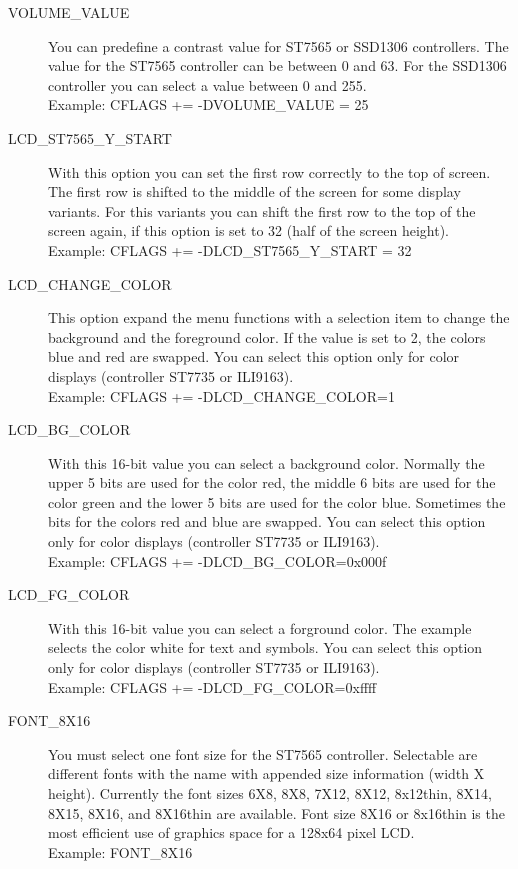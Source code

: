 \begin{description}
  \item[VOLUME\_VALUE] You can predefine a contrast value for ST7565 or SSD1306 controllers.
The value for the ST7565 controller can be between 0 and 63. For the SSD1306 controller you can
select a value between 0 and 255.\\
Example: CFLAGS += -DVOLUME\_VALUE = 25

  \item[LCD\_ST7565\_Y\_START] With this option you can set the first row correctly to the top of screen.
The first row is shifted to the middle of the screen for some display variants.
For this variants you can shift the first row to the top of the screen again,
if this option is set to 32 (half of the screen height).\\
Example: CFLAGS += -DLCD\_ST7565\_Y\_START = 32

  \item[LCD\_CHANGE\_COLOR] This option expand the menu functions with a selection item
to change the background and the foreground color.
If the value is set to 2, the colors blue and red are swapped.
You can select this option only for color displays (controller ST7735 or ILI9163).\\
Example: CFLAGS += -DLCD\_CHANGE\_COLOR=1

 \item[LCD\_BG\_COLOR] With this 16-bit value you can select a background color.
Normally the upper 5 bits are used for the color red, the middle 6 bits are used for the color green
and the lower 5 bits are used for the color blue. Sometimes the bits for the colors red and blue
are swapped.
You can select this option only for color displays (controller ST7735 or ILI9163).\\
Example: CFLAGS += -DLCD\_BG\_COLOR=0x000f

 \item[LCD\_FG\_COLOR] With this 16-bit value you can select a forground color.
The example selects the color white for text and symbols.
You can select this option only for color displays (controller ST7735 or ILI9163).\\
Example: CFLAGS += -DLCD\_FG\_COLOR=0xffff

  \item[FONT\_8X16] You must select one font size for the ST7565 controller.
  Selectable are different fonts with the name  with appended size information (width X height).
Currently the font sizes 6X8, 8X8, 7X12, 8X12, 8x12thin, 8X14, 8X15, 8X16, and 8X16thin are available.
Font size 8X16 or 8x16thin is the most efficient use of graphics space for a 128x64 pixel LCD.\\
Example: FONT\_8X16


\end{description}

